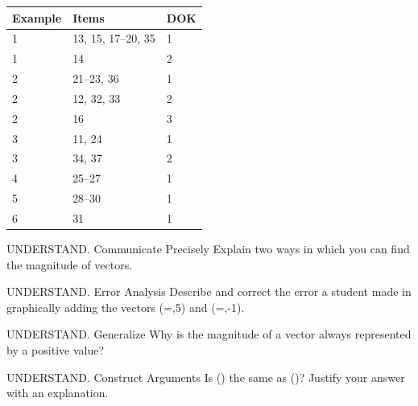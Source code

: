 \documentclass{article}
\newenvironment{item-analysis}{}{}      %
\newenvironment{practice}[2]{}{}        %
\newcommand{\answer}[1]{}               %
\newcommand{\placeholder}[2]{}          %
\newcommand{\te}[1]{}                   %
\begin{document}
\begin{item-analysis}
\begin{tabular}{lll}
\toprule
Example & Items & DOK \\
\midrule
1 & 13, 15, 17--20, 35 & 1 \\
1 & 14 & 2 \\
2 & 21--23, 36 & 1 \\
2 & 12, 32, 33 & 2 \\
2 & 16 & 3 \\
3 & 11, 24 & 1 \\
3 & 34, 37 & 2 \\
4 & 25--27 & 1 \\
5 & 28--30 & 1 \\
6 & 31 & 1 \\
\bottomrule
\end{tabular}
\end{item-analysis}
\begin{practice}{11}{1}
UNDERSTAND. Communicate Precisely Explain two ways in which you can find the magnitude of vectors.
\answer{You can use the Distance Formula or the Pythagorean Theorem.}
\end{practice}
\begin{practice}{12}{2}
UNDERSTAND. Error Analysis Describe and correct the error a student made in graphically adding the vectors (=,5\rangle) and (=,-1\rangle).
\placeholder{graph}{Incorrect student vector addition on pale blue unit grid, x and y axes with arrows both ends, labels -4,-2,2,4 and origin O. Solid gray arrows from (0,0) to (2,5) and (4,-1); dashed arrow from (2,5) to (4,-1). Window approximately [-5,5] on both axes. Large red X marks the work incorrect.}
\answer{Rather than placing the beginning of (\vec{BC}) at the terminal point of (\vec{AB}), the student placed it at the origin.}
\end{practice}
\begin{practice}{13}{1}
UNDERSTAND. Generalize Why is the magnitude of a vector always represented by a positive value?
\answer{Because the magnitude is the distance measure, it must be positive.}
\te{Printed positive; likely nonnegative, since the zero vector has magnitude zero.}
\end{practice}
\begin{practice}{14}{2}
UNDERSTAND. Construct Arguments Is () the same as ()? Justify your answer with an explanation.
\answer{No; even though they have the same magnitude, their directions are opposites.}
\end{practice}
\end{document}
